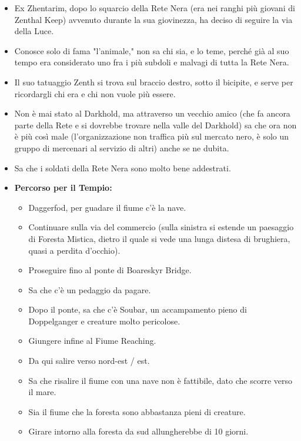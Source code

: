 \documentclass{article}
\begin{document}
\begin{itemize}
    \item Ex Zhentarim, dopo lo squarcio della Rete Nera (era nei ranghi più giovani di Zenthal Keep) avvenuto durante la sua giovinezza, ha deciso di seguire la via della Luce.
    \item Conosce solo di fama "l'animale," non sa chi sia, e lo teme, perché già al suo tempo era considerato uno fra i più subdoli e malvagi di tutta la Rete Nera.
    \item Il suo tatuaggio Zenth si trova sul braccio destro, sotto il bicipite, e serve per ricordargli chi era e chi non vuole più essere.
    \item Non è mai stato al Darkhold, ma attraverso un vecchio amico (che fa ancora parte della Rete e si dovrebbe trovare nella valle del Darkhold) sa che ora non è più così male (l’organizzazione non traffica più sul mercato nero, è solo un gruppo di mercenari al servizio di altri) anche se ne dubita.
    \item Sa che i soldati della Rete Nera sono molto bene addestrati.
    \item \textbf{Percorso per il Tempio:}
    \begin{itemize}
        \item Daggerfod, per guadare il fiume c'è la nave.
        \item Continuare sulla via del commercio (sulla sinistra si estende un paesaggio di Foresta Mistica, dietro il quale si vede una lunga distesa di brughiera, quasi a perdita d’occhio).
        \item Proseguire fino al ponte di Boareskyr Bridge.
        \item Sa che c'è un pedaggio da pagare.
        \item Dopo il ponte, sa che c'è Soubar, un accampamento pieno di Doppelganger e creature molto pericolose.
        \item Giungere infine al Fiume Reaching.
        \item Da qui salire verso nord-est / est.
        \item Sa che risalire il fiume con una nave non è fattibile, dato che scorre verso il mare.
        \item Sia il fiume che la foresta sono abbastanza pieni di creature.
        \item Girare intorno alla foresta da sud allungherebbe di 10 giorni.
    \end{itemize}
\end{itemize}
\end{document}
